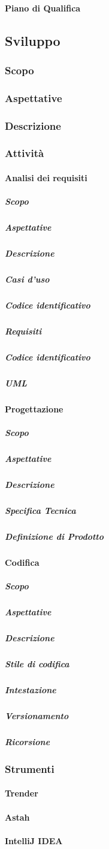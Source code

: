 		\paragraph{Piano di Qualifica}
	
\subsection{Sviluppo}
	\subsubsection{Scopo}
	\subsubsection{Aspettative}
	\subsubsection{Descrizione}
	\subsubsection{Attività}
		\paragraph{Analisi dei requisiti}
			\subparagraph{Scopo}
			\subparagraph{Aspettative}
			\subparagraph{Descrizione}
			\subparagraph{Casi d'uso}
			\subparagraph{Codice identificativo}
			\subparagraph{Requisiti}
			\subparagraph{Codice identificativo}
			\subparagraph{UML}
		\paragraph{Progettazione}
			\subparagraph{Scopo}
			\subparagraph{Aspettative}
			\subparagraph{Descrizione}
			\subparagraph{Specifica Tecnica}
			\subparagraph{Definizione di Prodotto}
		\paragraph{Codifica}
			\subparagraph{Scopo}
			\subparagraph{Aspettative}
			\subparagraph{Descrizione}
			\subparagraph{Stile di codifica}
			\subparagraph{Intestazione}
			\subparagraph{Versionamento}
			\subparagraph{Ricorsione}
	\subsubsection{Strumenti}
		\paragraph{Trender}
		\paragraph{Astah}
		\paragraph{IntelliJ IDEA}
			
			
